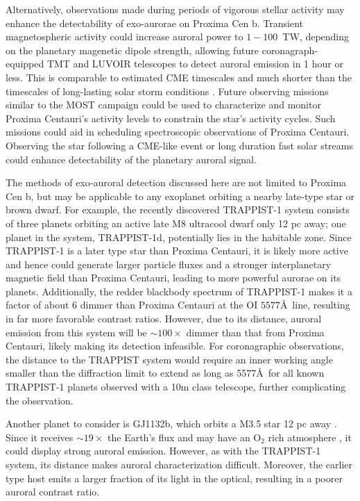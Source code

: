 \documentclass{emulateapj}
\begin{document}
Alternatively, observations made during periods of vigorous stellar activity may enhance the detectability of exo-aurorae on Proxima Cen b.  Transient magnetospheric activity could increase auroral power to $1-100$~TW, depending on the planetary magenetic dipole strength, allowing future coronagraph-equipped TMT and LUVOIR telescopes to detect auroral emission in 1 hour or less. This is comparable to estimated CME timescales \citep{Khodachenko2007} and much shorter than the timescales of long-lasting solar storm conditions \citep{Gonzalez1994,Gonzalez1999}. Future observing missions similar to the MOST campaign \citep[e.g.][]{Davenport2016} could be used to characterize and monitor Proxima Centauri's activity levels to constrain the star's activity cycles. Such missions could aid in scheduling spectroscopic observations of Proxima Centauri. Observing the star following a CME-like event or long duration fast solar streams could enhance detectability of the planetary auroral signal.  

The methods of exo-auroral detection discussed here are not limited to Proxima Cen b, but may be applicable to any exoplanet orbiting a nearby late-type star or brown dwarf.  For example, the recently discovered TRAPPIST-1 system \citep{Gillon2016} consists of three planets orbiting an active late M8 ultracool dwarf only 12 pc away; one planet in the system, TRAPPIST-1d, potentially lies in the habitable zone. Since TRAPPIST-1 is a later type star than Proxima Centauri, it is likely more active \citep[e.g.,][]{West2008} and hence could generate larger particle fluxes and a stronger interplanetary magnetic field than Proxima Centauri, leading to more powerful aurorae on its planets. Additionally, the redder blackbody spectrum of TRAPPIST-1 makes it a factor of about 6 dimmer than Proxima Centauri at the OI $5577$\AA\ line, resulting in far more favorable contrast ratios. However, due to its distance, auroral emission from this system will be ${\sim} 100\times$ dimmer than that from Proxima Centauri, likely making its detection infeasible. For coronagraphic observations, the distance to the TRAPPIST system would require an inner working angle smaller than the diffraction limit to extend as long as 5577\AA\ for all known TRAPPIST-1 planets observed with a 10m class telescope, further complicating the observation.

Another planet to consider is GJ1132b, which orbits a M3.5 star 12 pc away \citep{Berta2015}. Since it receives ${\sim} 19\times$ the Earth's flux and may have an O$_2$ rich atmosphere \citep{Schaefer2016}, it could display strong auroral emission. However, as with the TRAPPIST-1 system, its distance makes auroral characterization difficult. Moreover, the earlier type host emits a larger fraction of its light in the optical, resulting in a poorer auroral contrast ratio.
\end{document}
